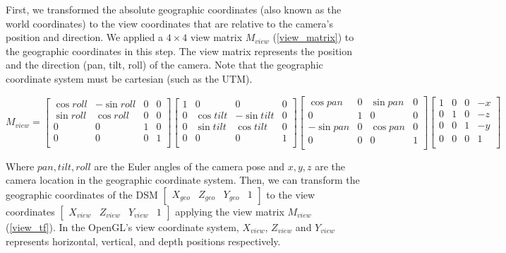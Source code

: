 \documentclass{article}
\begin{document}
First, we transformed the absolute geographic coordinates (also known as the world coordinates) to the view coordinates that are relative to the camera's position and direction. We applied a \(4 \times 4\) view matrix \(M_{view}\) (\ref{view_matrix}) to the geographic coordinates in this step. The view matrix represents the position and the direction (pan, tilt, roll) of the camera. Note that the geographic coordinate system must be cartesian (such as the UTM).

\label{view_matrix}
\begin{equation}
  M_{view} = 
  \begin{bmatrix}
    \cos roll & -\sin roll & 0 & 0 \\
    \sin roll & \cos roll & 0 & 0 \\
    0 & 0 & 1 & 0 \\
    0 & 0 & 0 & 1 \\
  \end{bmatrix}
  \begin{bmatrix}
    1 & 0 & 0 & 0 \\
    0 & \cos tilt & -\sin tilt & 0 \\
    0 & \sin tilt & \cos tilt & 0 \\
    0 & 0 & 0 & 1 \\
  \end{bmatrix}
  \begin{bmatrix}
    \cos pan & 0 & \sin pan & 0 \\
    0 & 1 & 0 & 0 \\
    -\sin pan & 0 & \cos pan & 0 \\
    0 & 0 & 0 & 1 \\
  \end{bmatrix}
  \begin{bmatrix}
    1 & 0 & 0 & -x \\
    0 & 1 & 0 & -z \\
    0 & 0 & 1 & -y \\
    0& 0 & 0 & 1 \\
  \end{bmatrix}
\end{equation}

Where \(pan, tilt, roll\) are the Euler angles of the camera pose and \(x, y, z\) are the camera location in the geographic coordinate system. Then, we can transform the geographic coordinates of the DSM \(\begin{bmatrix} X_{geo} & Z_{geo} & Y_{geo} & 1 \end{bmatrix}\) to the view coordinates \(\begin{bmatrix} X_{view} & Z_{view} & Y_{view} & 1 \end{bmatrix}\) applying the view matrix \(M_{view}\) (\ref{view_tf}). In the OpenGL's view coordinate system, \(X_{view}\), \(Z_{view}\) and \(Y_{view}\) represents horizontal, vertical, and depth positions respectively.
\end{document}
